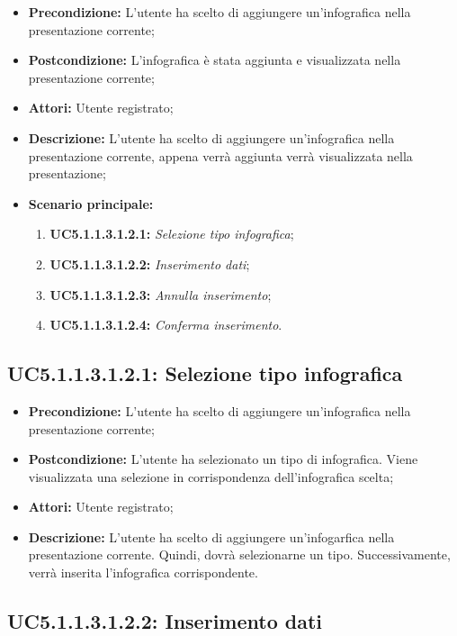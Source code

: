 \begin{itemize}
	\item \textbf{Precondizione:} L'utente ha scelto di aggiungere un'infografica  nella presentazione corrente;
	\item \textbf{Postcondizione:} L'infografica è stata aggiunta e visualizzata nella presentazione corrente;
	\item \textbf{Attori:} Utente registrato;
	\item \textbf{Descrizione:} L'utente ha scelto di aggiungere un'infografica nella presentazione corrente, appena verrà aggiunta verrà visualizzata nella presentazione;
	\item \textbf{Scenario principale:}
	\begin{enumerate}
		\item \textbf{ UC5.1.1.3.1.2.1:} \textit{ Selezione tipo infografica};
		\item \textbf{ UC5.1.1.3.1.2.2:} \textit{ Inserimento dati};
		\item \textbf{ UC5.1.1.3.1.2.3:} \textit{ Annulla inserimento};
		\item \textbf{ UC5.1.1.3.1.2.4:} \textit{ Conferma inserimento}.
	\end{enumerate}
\end{itemize}
\subsection{ UC5.1.1.3.1.2.1: Selezione tipo infografica}

\begin{itemize}
	\item \textbf{Precondizione:} L'utente ha scelto di aggiungere un'infografica nella presentazione corrente;
	\item \textbf{Postcondizione:} L'utente ha selezionato un tipo di infografica. Viene visualizzata una selezione in corrispondenza dell'infografica scelta;
	\item \textbf{Attori:} Utente registrato;
	\item \textbf{Descrizione:} L'utente ha scelto di aggiungere un'infogarfica nella presentazione corrente. Quindi, dovrà selezionarne un tipo. Successivamente, verrà inserita l'infografica corrispondente.
\end{itemize}
\subsection{ UC5.1.1.3.1.2.2: Inserimento dati}

